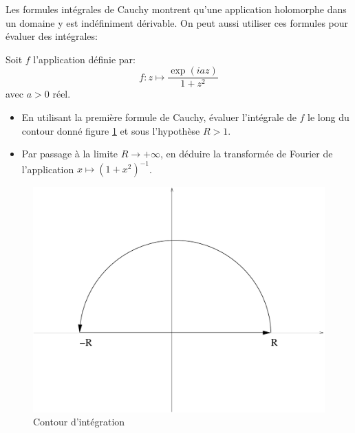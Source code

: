Les formules intégrales de Cauchy montrent qu'une application holomorphe dans un
domaine y est indéfiniment dérivable. On peut aussi utiliser ces formules pour
évaluer des intégrales:
\begin{exercice}
Soit $f$ l'application définie par:
\[
f \colon z \mapsto \frac{\exp(iaz)}{1+z^2}
\]
avec $a>0$ réel. 
\begin{itemize}
  \item En utilisant la première formule de Cauchy, évaluer l'intégrale de $f$
  le long du contour donné figure \ref{fig:contour_ex1} et sous l'hypothèse
  $R>1$.
  \item Par passage à la limite $R \to +\infty$, en déduire la transformée de
  Fourier de l'application $x \mapsto (1+x^2)^{-1}$.
\end{itemize}
\end{exercice}
\begin{figure}[ht]
\includegraphics[scale=0.3]{images/contour_ex1.pdf}
\caption{Contour d'intégration}\label{fig:contour_ex1}
\end{figure}
